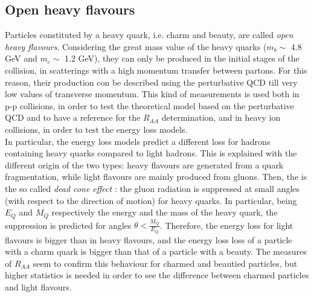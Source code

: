 \subsection{Open heavy flavours}
Particles constituted by a heavy quark, i.e. charm and beauty, are called \textit{open heavy flavours}. Considering the great mass value of the heavy quarks ($m_{b}\sim$ 4.8 GeV and $m_{c}\sim$ 1.2 GeV), they can only be produced in the initial stages of the collision, in scatterings with a high momentum transfer between partons. For this reason, their production con be described using the perturbative QCD till very low values of transverse momentum. This kind of measurements is used both in p-p collisions, in order to test the theoretical model based on the perturbative QCD and to have a reference for the $R_{AA}$ determination, and in heavy ion collisions, in order to test the energy loss models.\\
In particular, the energy loss models predict a different loss for hadrons containing heavy quarks compared to light hadrons. This is explained with the different origin of the two types: heavy flavours are generated from a quark fragmentation, while light flavours are mainly produced from gluons. Then, the is the so called \textit{dead cone effect} \cite{deadcone}: the gluon radiation is suppressed at small angles (with respect to the direction of motion) for heavy quarks. In particular, being $E_{Q}$ and $M_{Q}$ respectively the energy and the mass of the heavy quark, the suppression is predicted for angles $\theta<\frac{M_{Q}}{E_{Q}}$. Therefore, the energy loss for light flavours is bigger than in heavy flavours, and the energy loss loss of a particle with a charm quark is bigger than that of a particle with a beauty. The measures of $R_{AA}$ seem to confirm this behaviour for charmed and beautied particles, but higher statistics is needed in order to see the difference between charmed particles and light flavours.\\
%
